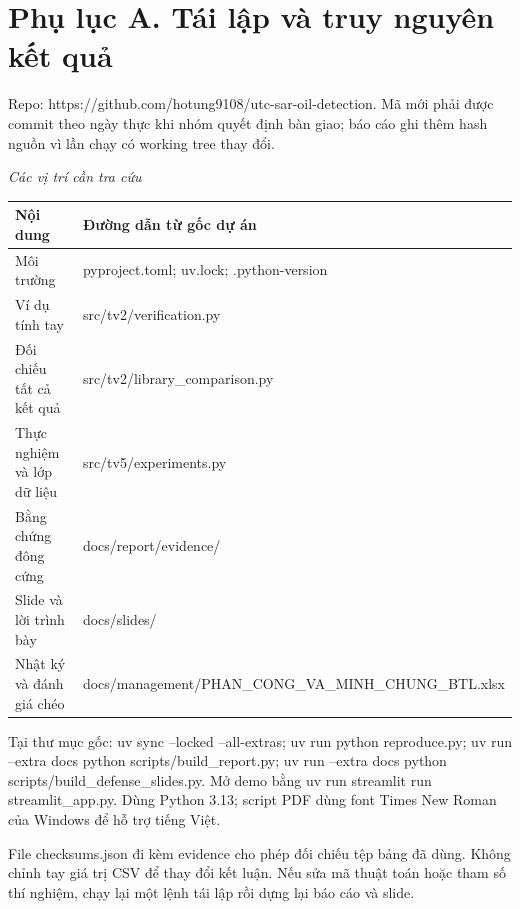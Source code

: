 \documentclass[13pt,a4paper]{extreport}
\begin{document}
\section*{Phụ lục A. Tái lập và truy nguyên kết quả}
Repo: https://github.com/hotung9108/utc-sar-oil-detection. Mã mới phải được commit theo ngày thực khi nhóm quyết định bàn giao; báo cáo ghi thêm hash nguồn vì lần chạy có working tree thay đổi.
\par
\noindent\textit{Các vị trí cần tra cứu}
\begin{longtable}{p{7.3cm}|p{7.3cm}}
Nội dung & Đường dẫn từ gốc dự án\\\hline
Môi trường & pyproject.toml; uv.lock; .python-version\\\hline
Ví dụ tính tay & src/tv2/verification.py\\\hline
Đối chiếu tất cả kết quả & src/tv2/library\_comparison.py\\\hline
Thực nghiệm và lớp dữ liệu & src/tv5/experiments.py\\\hline
Bằng chứng đông cứng & docs/report/evidence/\\\hline
Slide và lời trình bày & docs/slides/\\\hline
Nhật ký và đánh giá chéo & docs/management/PHAN\_CONG\_VA\_MINH\_CHUNG\_BTL.xlsx\\\hline
\end{longtable}
Tại thư mục gốc: uv sync --locked --all-extras; uv run python reproduce.py; uv run --extra docs python scripts/build\_report.py; uv run --extra docs python scripts/build\_defense\_slides.py. Mở demo bằng uv run streamlit run streamlit\_app.py. Dùng Python 3.13; script PDF dùng font Times New Roman của Windows để hỗ trợ tiếng Việt.
\par
File checksums.json đi kèm evidence cho phép đối chiếu tệp bảng đã dùng. Không chỉnh tay giá trị CSV để thay đổi kết luận. Nếu sửa mã thuật toán hoặc tham số thí nghiệm, chạy lại một lệnh tái lập rồi dựng lại báo cáo và slide.
\par
\clearpage
\end{document}
